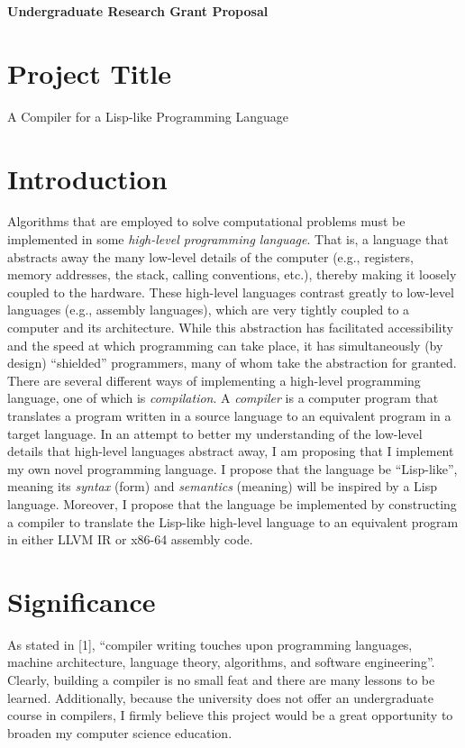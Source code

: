 \documentclass[12pt]{report}
\begin{document}
\begin{center}
	\textbf{{\LARGE Undergraduate Research Grant Proposal}}
\end{center}

\section*{{\large Project Title}}
A Compiler for a Lisp-like Programming Language

\section*{{\large Introduction}}
Algorithms that are employed to solve computational problems must be implemented in some \textit{high-level programming language}.  That is, a language that abstracts away the many low-level details of the computer (e.g., registers, memory addresses, the stack, calling conventions, etc.), thereby making it loosely coupled to the hardware. These high-level languages contrast greatly to low-level languages (e.g., assembly languages), which are very tightly coupled to a computer and its architecture.  While this abstraction has facilitated accessibility and the speed at which programming can take place, it has simultaneously (by design) ``shielded'' programmers, many of whom take the abstraction for granted.
There are several different ways of implementing a high-level programming language, one of which is \textit{compilation}.  A \textit{compiler} is a computer program that translates a program written in a source language to an equivalent program in a target language.
In an attempt to better my understanding of the low-level details that high-level languages abstract away, I am proposing that I implement my own novel programming language.  I propose that the language be ``Lisp-like'', meaning its \textit{syntax} (form) and \textit{semantics} (meaning) will be inspired by a Lisp language.  Moreover, I propose that the language be implemented by constructing a compiler to translate the Lisp-like high-level language to an equivalent program in either LLVM IR or x86-64 assembly code.

\section*{{\large Significance}}
As stated in [1], ``compiler writing touches upon programming languages, machine architecture, language theory, algorithms, and software engineering''.  Clearly, building a compiler is no small feat and there are many lessons to be learned.  Additionally, because the university does not offer an undergraduate course in compilers, I firmly believe this project would be a great opportunity to broaden my computer science education.
\end{document}
